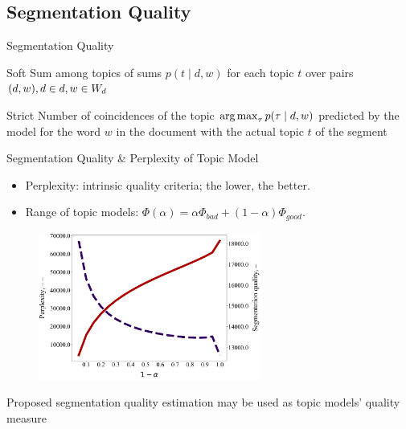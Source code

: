 \documentclass[russian]{beamer}
\begin{document}
\subsection{Segmentation Quality}

\begin{frame}{Segmentation Quality}
  \begin{block}{Soft}
    Sum among topics of sums $p(t \mid d, w)$ for each topic $t$ over pairs $(d, w), d \hm\in d, w \hm\in W_d$
  \end{block}
  
  \begin{block}{Strict}
    Number of coincidences of the topic $\operatorname*{arg\,max}_\tau p(\tau \mid d, w)$ predicted by the model for the word $w$ in the document with the actual topic $t$ of the segment
  \end{block}
\end{frame}


\begin{frame}{Segmentation Quality \& Perplexity of Topic Model}
  \begin{itemize}\setlength{\itemindent}{-1em}
  \item Perplexity: intrinsic quality criteria; the lower, the better.
  \item Range of topic models: $\Phi(\alpha) = \alpha \Phi_{bad} + (1 - \alpha) \Phi_{good}$.
  \end{itemize}
  
  \begin{figure}[h]
    \centering
    \includegraphics[width=0.65\textwidth]{segm_quality-iteration200}
  \end{figure}
  
  \begin{block}{}
    Proposed segmentation quality estimation may be used as topic models’ quality measure
  \end{block}
\end{frame}
\end{document}
